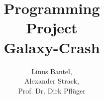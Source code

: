 \documentclass[aspectratio=169,table,x11names,dvipsnames]{beamer}
\institute[logo=.logos/ipvslogo_rund_blau_dunkel.pdf, url=https://www.ipvs.uni-stuttgart.de/]{Institute for Parallel and Distributed Systems}{IPVS}
\title{Programming\\ Project\\ Galaxy-Crash}
\author[Bantel, Strack, Prof. Pflüger]{Linus Bantel,\\Alexander Strack,\\Prof. Dr. Dirk Pflüger}
\date{\semester}
\begin{document}
  \titleslide

  
\end{document}
